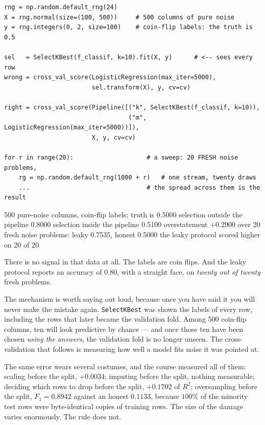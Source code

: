 \documentclass[11pt]{article}
\begin{document}
\begin{lstlisting}
rng = np.random.default_rng(24)
X = rng.normal(size=(100, 500))     # 500 columns of pure noise
y = rng.integers(0, 2, size=100)    # coin-flip labels: the truth is 0.5

sel   = SelectKBest(f_classif, k=10).fit(X, y)      # <-- sees every row
wrong = cross_val_score(LogisticRegression(max_iter=5000),
                        sel.transform(X), y, cv=cv)

right = cross_val_score(Pipeline([("k", SelectKBest(f_classif, k=10)),
                                  ("m", LogisticRegression(max_iter=5000))]),
                        X, y, cv=cv)

for r in range(20):                    # a sweep: 20 FRESH noise problems,
    rg = np.random.default_rng(1000 + r)   # one stream, twenty draws
    ...                                # the spread across them is the result
\end{lstlisting}
\begin{codeout}
500 pure-noise columns, coin-flip labels; truth is 0.5000
selection outside the pipeline   0.8000
selection inside the pipeline    0.5100
overstatement                    +0.2900
over 20 fresh noise problems: leaky 0.7535, honest 0.5000
the leaky protocol scored higher on 20 of 20
\end{codeout}

There is no signal in that data at all. The labels are coin flips. And the
leaky protocol reports an accuracy of $0.80$, with a straight face, on
\emph{twenty out of twenty} fresh problems.

The mechanism is worth saying out loud, because once you have said it you will
never make the mistake again. \texttt{SelectKBest} was shown the labels of
every row, including the rows that later became the validation fold. Among
500 coin-flip columns, ten will look predictive by chance --- and once those
ten have been chosen \emph{using the answers}, the validation fold is no
longer unseen. The cross-validation that follows is measuring how well a
model fits noise it was pointed at.

\begin{caution}
The same error wears several costumes, and the course measured all of them:
scaling before the split, $+0.0034$; imputing before the split, nothing
measurable; deciding which rows to drop before the split, $+0.1702$ of $R^2$;
oversampling before the split, $F_1 = 0.8942$ against an honest $0.1133$,
because $100\%$ of the minority test rows were byte-identical copies of
training rows. The size of the damage varies enormously. The rule does not.
\end{caution}
\end{document}
